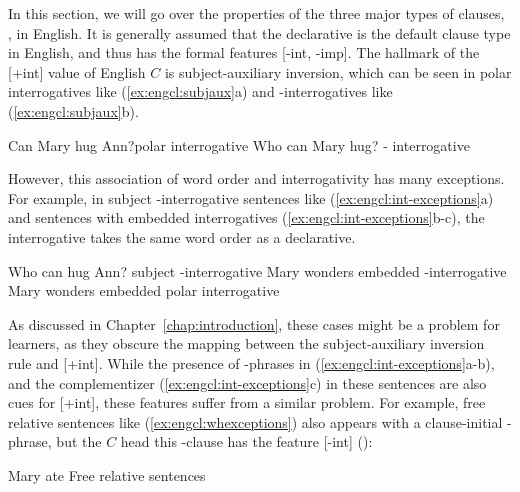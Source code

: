 In this section, we will go over the properties of the three major types of clauses, \diis{}, in English. 
It is generally assumed that the declarative is the default clause type in English, and thus has the formal features [-int, -imp]. The hallmark of the [+int] value of English $C$ is subject-auxiliary inversion, which can be seen in polar interrogatives like  (\ref{ex:engcl:subjaux}a) and \twh-interrogatives like (\ref{ex:engcl:subjaux}b). 

\bxl{}
Can Mary hug Ann?\hfill polar interrogative
\ex
Who can Mary hug? \hfill \twh-
interrogative
\exl
\eex


However, this association of word order and interrogativity has many exceptions. For example, in subject \twh-interrogative sentences like (\ref{ex:engcl:int-exceptions}a) and sentences with embedded interrogatives (\ref{ex:engcl:int-exceptions}b-c), the interrogative takes the same word order as a declarative. 

\bxl{}
Who can hug Ann? \hfill subject \twh-interrogative
\ex
Mary wonders  \hfill embedded \twh-interrogative
\ex 
Mary wonders  \hfill embedded polar interrogative
\exl
\eex

As discussed in Chapter~\ref{chap:introduction}, these cases might be a problem for learners, as they obscure the mapping between the subject-auxiliary inversion rule and [+int]. While the presence of \twh-phrases in (\ref{ex:engcl:int-exceptions}a-b), and the complementizer  (\ref{ex:engcl:int-exceptions}c) in these sentences are also cues for [+int], these features suffer from a similar problem. For example, free relative sentences like (\ref{ex:engcl:whexceptions}) also appears with a clause-initial \twh-phrase, but the $C$ head this \twh-clause has the feature [-int] (\cite{bresnan1978free, caponigro2003free}):

Mary ate  \hfill Free relative sentences
\eex


